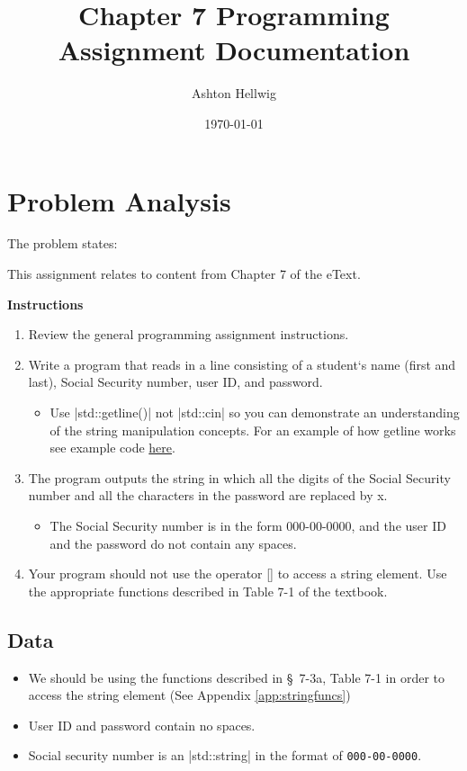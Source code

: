 \documentclass[a4paper, 11pt]{article}
\title{Chapter 7 Programming Assignment Documentation}
\author{Ashton Hellwig}
\date\today
\theoremstyle{definition}
\theoremstyle{plain}
\begin{document}
  \maketitle
  \tableofcontents
  \listofalgorithms
  \lstlistoflistings
  \listoffigures
  \newpage


  \section{Problem Analysis}
    The problem states:
    \begin{mdframed}[backgroundcolor=green!20]
      This assignment relates to content from Chapter 7 of the eText.

      \textbf{Instructions}\vspace{-8pt}
      \begin{enumerate}
        \item Review the general programming assignment instructions.
        \item Write a program that reads in a line consisting of a student`s
          name (first and last), Social Security number, user ID, and password.
          \begin{itemize}
            \item Use |std::getline()| not |std::cin| so you can demonstrate an
              understanding of the string manipulation concepts. For an example
              of how getline works see example code
              \href{http://www.cplusplus.com/reference/string/string/getline}%
              {here}.
          \end{itemize}
        \item The program outputs the string in which all the digits of the
          Social Security number and all the characters in the password are
          replaced by x.
          \begin{itemize}
            \item The Social Security number is in the form 000-00-0000, and the
              user ID and the password do not contain any spaces.
          \end{itemize}
        \item Your program should not use the operator [] to access a string
          element. Use the appropriate functions described in Table 7-1 of the
          textbook.
      \end{enumerate}
    \end{mdframed}

    \subsection{Data}
      \begin{itemize}
        \item We should be using the functions described in \S~7-3a, Table 7-1
          in order to access the string element (See Appendix
          \ref{app:stringfuncs})
        \item User ID and password contain no spaces.
        \item Social security number is an |std::string| in the format of
          \texttt{000-00-0000}.
      \end{itemize}
\end{document}
